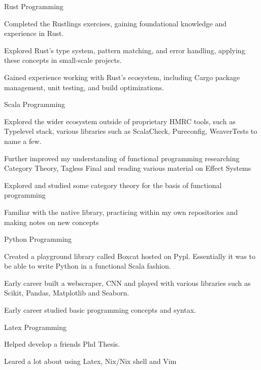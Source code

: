 \begin{cventries}
  \cventry
    {Rust Programming} %
    {} %
    {} %
    {} %
    {
      \begin{cvitems}
        \item {Completed the Rustlings exercises, gaining foundational knowledge and experience in Rust.}
        \item {Explored Rust’s type system, pattern matching, and error handling, applying these concepts in small-scale projects.}
        \item {Gained experience working with Rust’s ecosystem, including Cargo package management, unit testing, and build optimizations.}
      \end{cvitems}
    }

  \cventry
  {Scala Programming} %
  {} %
  {} %
  {} %
  {
    \begin{cvitems}
      \item {Explored the wider ecosystem outside of proprietary HMRC tools, such as Typelevel stack, various libraries such as ScalaCheck, Pureconfig, WeaverTests to name a few.}
      \item {Further improved my understanding of functional programming researching Category Theory, Tagless Final and reading various material on Effect Systems}
      \item {Explored and studied some category theory for the basis of functional programming}
      \item {Familiar with the native library, practicing within my own repositories and making notes on new concepts}
    \end{cvitems}
  }
  \cventry
  {Python Programming} %
  {} %
  {} %
  {} %
  {
    \begin{cvitems}
      \item {Created a playground library called Boxcat hosted on Pypl. Essentially it was to be able to write Python in a functional Scala fashion.}
      \item {Early career built a webscraper, CNN and played with various libraries such as Scikit, Pandas, Matplotlib and Seaborn.}
      \item {Early career studied basic programming concepts and syntax.}
    \end{cvitems}
  }
\cventry
{Latex Programming} %
{} %
{} %
{} %
{
  \begin{cvitems}
    \item {Helped develop a friends Phd Thesis.}
    \item {Leared a lot about using Latex, Nix/Nix shell and Vim}
  \end{cvitems}
}


\end{cventries}
